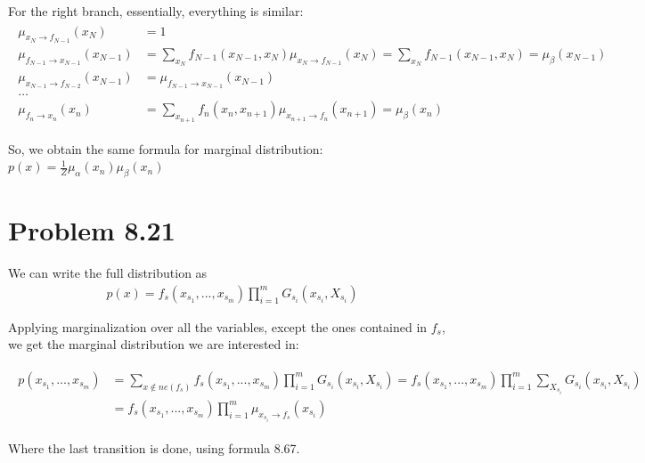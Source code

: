 \documentclass[fleqn]{article}
\begin{document}
For the right branch, essentially, everything is similar:
\begin{align}
	\begin{split}
		\mu_{x_N\to f_{N-1}} (x_N)&= 1 \\
		\mu_{f_{N-1}\to x_{N-1}} (x_{N-1})&= \sum\limits_{x_N}f_{N-1}(x_{N-1}, x_N)\mu_{x_{N}\to f_{N-1}}(x_N) = \sum\limits_{x_N}f_{N-1}(x_{N-1}, x_N) = \mu_\beta(x_{N-1})\\
		\mu_{x_{N-1}\to f_{N-2}}(x_{N-1}) &= \mu_{f_{N-1}\to x_{N-1}}(x_{N-1})\\
		\ldots\\
		\mu_{f_{n}\to x_n}(x_n) &= \sum\limits_{x_{n+1}}f_{n}(x_{n}, x_{n+1})\mu_{x_{n+1}\to f_{n}}(x_{n+1}) = \mu_\beta(x_n)
	\end{split}
\end{align}

So, we obtain the same formula for marginal distribution: $p(x) = \frac{1}{Z}\mu_\alpha(x_n) \mu_\beta(x_n)$

\section*{Problem 8.21}

We can write the full distribution as 
\begin{align}
	p(x) = f_s(x_{s_1},...,x_{s_m})\prod\limits_{i=1}^mG_{s_i}(x_{s_i}, X_{s_i})
\end{align}

Applying marginalization over all the variables, except the ones contained in $f_s$, we get the marginal distribution we are interested in: 

\begin{align}
	\begin{split}
	p(x_{s_1},...,x_{s_m}) &= \sum\limits_{x \notin ne(f_s)}f_s(x_{s_1},...,x_{s_m})\prod\limits_{i=1}^mG_{s_i}(x_{s_i}, X_{s_i}) = f_s(x_{s_1},...,x_{s_m})\prod\limits_{i=1}^m\sum\limits_{X_{s_i}}G_{s_i}(x_{s_i}, X_{s_i}) \\
	&= f_s(x_{s_1},...,x_{s_m})\prod\limits_{i=1}^m\mu_{x_{s_i}\to f_s}(x_{s_i})
	\end{split}
\end{align}

Where the last transition is done, using formula 8.67.
\end{document}
